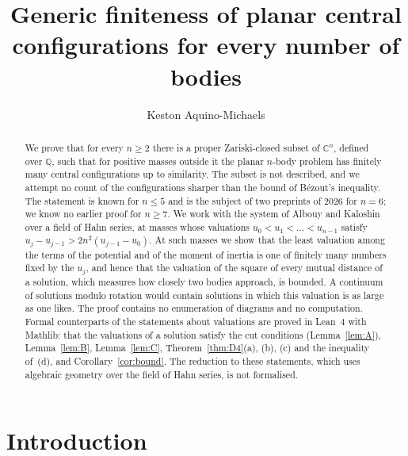 \documentclass[11pt]{amsart}
\theoremstyle{definition}
\theoremstyle{remark}
\numberwithin{equation}{section}
\newcommand{\QQ}{\mathbb{Q}}
\newcommand{\CC}{\mathbb{C}}
\begin{document}
\title[Generic finiteness of planar central configurations]{Generic finiteness of planar central configurations for every number of bodies}

\author{Keston Aquino-Michaels}
\address{No Way Labs}

\begin{abstract}
We prove that for every $n \ge 2$ there is a proper Zariski-closed subset of $\CC^n$, defined over
$\QQ$, such that for positive masses outside it the planar $n$-body problem has finitely many central
configurations up to similarity. The subset is not described, and we attempt no count of the
configurations sharper than the bound of B\'ezout's inequality. The statement is known for $n \le 5$ and is the subject of two preprints of 2026 for
$n = 6$; we know no earlier proof for $n \ge 7$. We work with the system of Albouy and Kaloshin over a
field of Hahn series, at masses whose valuations $u_0 < u_1 < \dots < u_{n-1}$ satisfy
$u_j - u_{j-1} > 2n^2 (u_{j-1} - u_0)$. At such masses we show that the least valuation among the terms
of the potential and of the moment of inertia is one of finitely many numbers fixed by the $u_j$, and
hence that the valuation of the square of every mutual distance of a solution, which measures how
closely two bodies approach, is bounded. A continuum of solutions modulo rotation would contain
solutions in which this valuation is as large as one likes. The proof contains no
enumeration of diagrams and no computation. Formal counterparts of the statements about valuations are
proved in Lean~4 with Mathlib: that the valuations of a solution satisfy the cut conditions
(Lemma~\ref{lem:A}), Lemma~\ref{lem:B}, Lemma~\ref{lem:C}, Theorem~\ref{thm:D4}(a), (b), (c) and the
inequality of~(d), and Corollary~\ref{cor:bound}. The reduction to these statements, which uses algebraic geometry over the
field of Hahn series, is not formalised.
\end{abstract}

\maketitle

\section{Introduction}\label{sec:intro}
\end{document}
